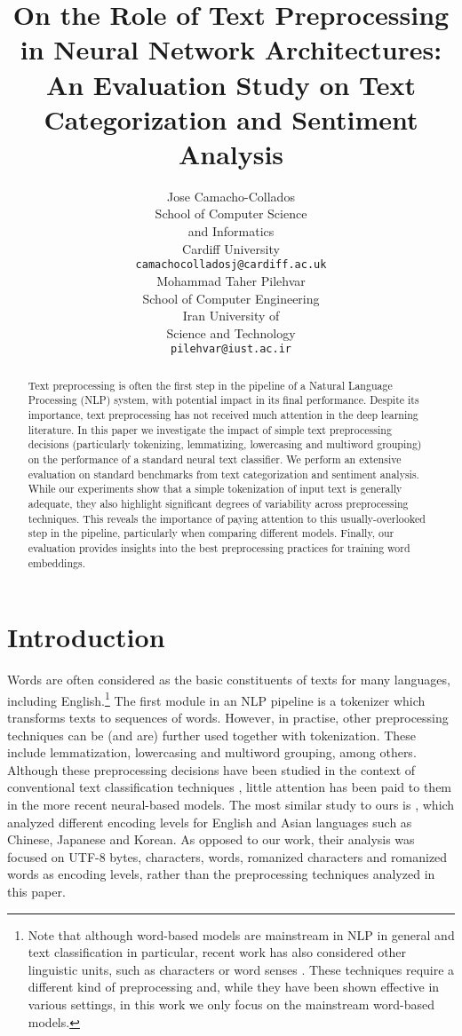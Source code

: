 \documentclass[11pt,a4paper]{article}
\title{On the Role of Text Preprocessing in Neural Network Architectures: \\ An Evaluation Study on Text Categorization and Sentiment Analysis}
\author{Jose Camacho-Collados \\
  School of Computer Science \\ and Informatics\\
  Cardiff University\\
  {\tt camachocolladosj@cardiff.ac.uk} \\
  \And
  Mohammad Taher Pilehvar\\
  School of Computer Engineering\\
  Iran University of \\Science and Technology\\
  {\tt pilehvar@iust.ac.ir} \\}
\date{}
\begin{document}
\maketitle
\begin{abstract}
 Text preprocessing is often the first step in the pipeline of a Natural Language Processing (NLP) system, with potential impact in its final performance.
 Despite its importance, text preprocessing has not received much attention in the deep learning literature.
 In this paper we investigate the impact of simple text preprocessing decisions (particularly tokenizing, lemmatizing, lowercasing and multiword grouping) on the performance of a standard neural text classifier. 
 We perform an extensive evaluation on standard benchmarks from text categorization and sentiment analysis. While our experiments show that a simple tokenization of input text is generally adequate, they also highlight significant degrees of variability across preprocessing techniques. This reveals the importance of paying attention to this usually-overlooked step in the pipeline, particularly when comparing different models. Finally, our evaluation provides insights into the best preprocessing practices for training word embeddings.\end{abstract}





\section{Introduction}

Words are often considered as the basic constituents of texts for many languages, including English.\footnote{Note that although word-based models are mainstream in NLP in general and text classification in particular, recent work has also considered other linguistic units, such as characters  \cite{kim2015character,XiaoCho:2016} or word senses \cite{LiJurafsky:2015,flekovasupersense,pilehvaracl17}. These techniques require a different kind of preprocessing and, while they have been shown effective in various settings, in this work we only focus on the mainstream word-based models.}
The first module in an NLP pipeline is a tokenizer which transforms texts to sequences of words.
However, in practise, other preprocessing techniques can be (and are) further used together with tokenization. 
These include lemmatization, lowercasing and multiword grouping, among others.
Although these preprocessing decisions have been studied in the context of conventional text classification techniques \cite{leopold2002text,uysal2014impact}, little attention has been paid to them in the more recent neural-based models. The most similar study to ours is , which analyzed different encoding levels for English and Asian languages such as Chinese, Japanese and Korean. As opposed to our work, their analysis was focused on UTF-8 bytes, characters, words, romanized characters and romanized words as encoding levels, rather than the preprocessing techniques analyzed in this paper. 
\end{document}
